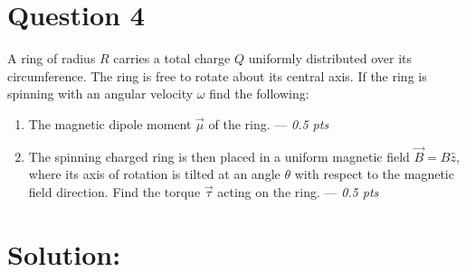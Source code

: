 \section*{Question 4}
A ring of radius $R$ carries a total charge $Q$ uniformly distributed over its circumference. The ring is free to rotate about its central axis. If the ring is spinning with an angular velocity $\omega$ find the following:
\begin{enumerate}
  \item[(a)] The magnetic dipole moment \(\vec{\mu}\) of the ring. --- \textit{0.5 pts}
  \item[(b)] The spinning charged ring is then placed in a uniform magnetic field $\vec{B}=B\hat{z}$, where its axis of rotation is tilted at an angle $\theta$ with respect to the magnetic field direction. Find the torque \(\vec{\tau}\) acting on the ring. --- \textit{0.5 pts}
\end{enumerate}

\section*{Solution:}